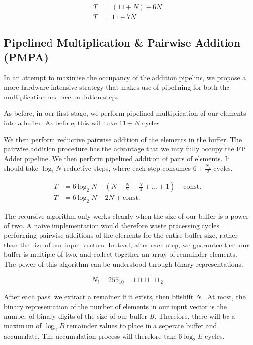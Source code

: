 \documentclass[a4paper,8pt]{report}
\begin{document}
\begin{align*}
  T &= (11 + N) + 6N \\
  T &= 11 + 7N
\end{align*}
\subsection{Pipelined Multiplication \& Pairwise Addition (PMPA)}
In an attempt to maximise the occupancy of the addition pipeline, we propose a
more hardware-intensive strategy that makes use of pipelining for both the
multiplication and accumulation steps.

As before, in our first stage, we perform pipelined multiplication of our
elements into a buffer. As before, this will take $11+N$ cycles

We then perform reductive pairwise addition of the elements in the buffer.
The pairwise addition procedure has the advantage that we may fully occupy the
FP Adder pipeline. We then perform pipelined addition of pairs of elements.
It should take $\log_2{N}$ reductive steps, where each step consumes
$6+\frac{N_{i}}{2}$ cycles.

\begin{align*}
  T &= 6\log_2{N} + \left(N + \frac{N}{2} + \frac{N}{4} + ... + 1\right) + \text{const.}\\
  T &= 6\log_2{N} + 2N + \text{const.}
\end{align*}

The recursive algorithm only works cleanly when the size of our buffer is a
power of two. A naive implementation would therefore waste processing cycles
performing pairwise additions of the elements for the entire buffer size, rather
than the size of our input vectors. Instead, after each step, we guarantee that
our buffer is multiple of two, and collect together an array of remainder
elements. The power of this algorithm can be understood through binary
representations.

\begin{align*}
  N_i = 255_{10} = 11111111_{2}
\end{align*}

After each pass, we extract a remainer if it exists, then bitshift $N_i$. At
most, the binary representation of the number of elements in our input vector is
the number of binary digits of the size of our buffer $B$. Therefore, there will
be a maximum of $\log_{2}{B}$ remainder values to place in a seperate buffer and
accumulate. The accumulation process will therefore take $6\log_{2}{B}$ cycles.
\end{document}
